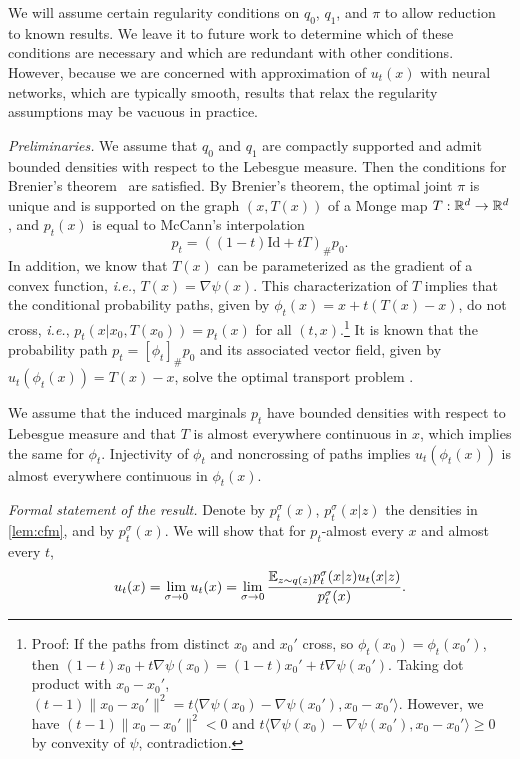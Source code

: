 \documentclass[10pt]{article}
\theoremstyle{plain}
\theoremstyle{definition}
\theoremstyle{remark}
\newcommand{\ie}{\textit{i.e.}}
\begin{document}
\begin{proofE}
We will assume certain regularity conditions on $q_0$, $q_1$, and $\pi$ to allow reduction to known results. We leave it to future work to determine which of these conditions are necessary and which are redundant with other conditions. However, because we are concerned with approximation of $u_t(x)$ with neural networks, which are typically smooth, results that relax the regularity assumptions may be vacuous in practice.

\textit{Preliminaries.} We assume that $q_0$ and $q_1$ are compactly supported and admit bounded densities with respect to the Lebesgue measure. 
Then the conditions for Brenier's theorem~\citep{brenier_polar_1991} are satisfied. By Brenier's theorem, the optimal joint $\pi$ is unique and is supported on the graph $(x, T(x))$ of a Monge map $T: \mathbb{R}^d \to \mathbb{R}^d$, and $p_t(x)$ is equal to McCann's interpolation \cite[Chapter 7]{peyre_computational_2019}
\begin{equation}\label{eq:mccann}
    p_t = ((1 -t) \textrm{Id} + t T)_\# p_0.
\end{equation}
In addition, we know that $T(x)$ can be parameterized as the gradient of a convex function, \ie, $T(x) = \nabla \psi(x)$. This characterization of $T$ implies that the conditional probability paths, given by $\phi_t(x)=x+t(T(x)-x)$, do not cross, \ie, $p_t(x | x_0, T(x_0)) = p_t(x)$ for all $(t, x)$.\footnote{Proof: If the paths from distinct $x_0$ and $x_0'$ cross, so $\phi_t(x_0)=\phi_t(x_0')$, then $(1-t)x_0+t\nabla\psi(x_0)=(1-t)x_0'+t\nabla\psi(x_0')$. Taking dot product with $x_0-x_0'$, $(t-1)\|x_0-x_0'\|^2=t\langle \nabla\psi(x_0)-\nabla\psi(x_0'),x_0-x_0'\rangle$. However, we have $(t-1)\|x_0-x_0'\|^2<0$ and $t\langle \nabla\psi(x_0)-\nabla\psi(x_0'),x_0-x_0'\rangle\geq0$ by convexity of $\psi$, contradiction.} It is known that the probability path $p_t=[\phi_t]_{\#}p_0$ and its associated vector field, given by $u_t(\phi_t(x))=T(x)-x$, solve the optimal transport problem \cite[Proposition 1.1]{Benamou(2000)}.

We assume that the induced marginals $p_t$ have bounded densities with respect to Lebesgue measure and that $T$ is almost everywhere continuous in $x$, which implies the same for $\phi_t$. Injectivity of $\phi_t$ and noncrossing of paths implies $u_t(\phi_t(x))$ is almost everywhere continuous in $\phi_t(x)$.

\textit{Formal statement of the result.} Denote by $p_t^\sigma(x)$, $p_t^\sigma(x|z)$ the densities in \autoref{lem:cfm}, and by $p_t^\sigma(x)$. We will show that for $p_t$-almost every $x$ and almost every $t$, 
\begin{equation}\label{eq:ut_ae_eq_utsigma}
u_t(x)=\lim_{\sigma\to0}u_t(x)=\lim_{\sigma\to0}\frac{\mathbb{E}_{z\sim q(z)}p_t^\sigma(x|z)u_t(x|z)}{p_t^\sigma(x)}.
\end{equation}


\end{proofE}
\end{document}
